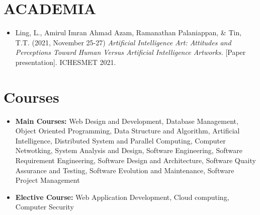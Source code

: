 \documentclass[a4paper,11pt]{article}
\newcommand{\resumeItem}[2]{
  \item\small{
    \textbf{{#1:} }{#2 \vspace{-2pt}}
  }
}
\newcommand{\resumeSubItem}[2]{\resumeItem{#1}{#2}\vspace{-4pt}}
\newcommand{\resumeSubHeadingListStart}{\begin{itemize}[leftmargin=*]}
\newcommand{\resumeSubHeadingListEnd}{\end{itemize}}
\begin{document}
\section{ACADEMIA}
 {\small
  \begin{itemize}[leftmargin=*]{\footnotesize}
    \item{Ling, L., Amirul Imran Ahmad Azam, Ramanathan Palaniappan, \& Tin, T.T. (2021, November 25-27) \textit{Artificial Intelligence Art: Attitudes and Perceptions Toward Human Versus Artificial Intelligence Artworks.} [Paper presentation]. ICHESMET 2021. \vspace{-2pt}}
  \end{itemize}
 }


\section{Courses}
\resumeSubHeadingListStart
\resumeSubItem{Main Courses}{Web Design and Development, Database Management, 
Object Oriented Programming, Data Structure and Algorithm, Artificial Intelligence, 
Distributed System and Parallel Computing, Computer Netwotking, System Analysis and Design, 
Software Engineering, Software Requirement Engineering, Software Design and Architecture, 
Software Quaity Assurance and Testing, Software Evolution and Maintenance, 
Software Project Management}
\resumeSubItem{Elective Course}{Web Application Development, Cloud computing, Computer Security}
\resumeSubHeadingListEnd

\end{document}
